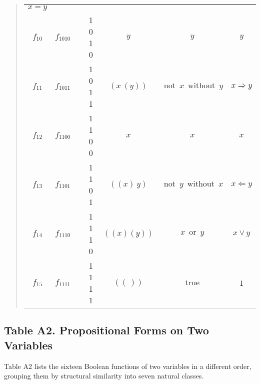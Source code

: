 \documentclass[12pt]{article}
\begin{document}
\begin{quote}
\begin{tabular}{|c|c|c|c|c|c|c|}
$x = y$     \\
$f_{10}$    &
$f_{1010}$  &&
1 0 1 0     &
$y$         &
$y$         &
$y$         \\
$f_{11}$    &
$f_{1011}$  &&
1 0 1 1     &
$(x\ (y))$  &
$\operatorname{not}\ x\ \operatorname{without}\ y$ &
$x \Rightarrow y$ \\
$f_{12}$    &
$f_{1100}$  &&
1 1 0 0     &
$x$         &
$x$         &
$x$         \\
$f_{13}$    &
$f_{1101}$  &&
1 1 0 1     &
$((x)\ y)$  &
$\operatorname{not}\ y\ \operatorname{without}\ x$ &
$x \Leftarrow y$ \\
$f_{14}$    &
$f_{1110}$  &&
1 1 1 0     &
$((x)(y))$  &
$x\ \operatorname{or}\ y$ &
$x \lor y$  \\
$f_{15}$    &
$f_{1111}$  &&
1 1 1 1     &
$((~))$     &
$\operatorname{true}$ &
$1$         \\
\hline
\end{tabular}\end{quote}

\subsection{Table A2.  Propositional Forms on Two Variables}

Table A2 lists the sixteen Boolean functions of two variables in a different order, grouping them by structural similarity into seven natural classes.
\end{document}
